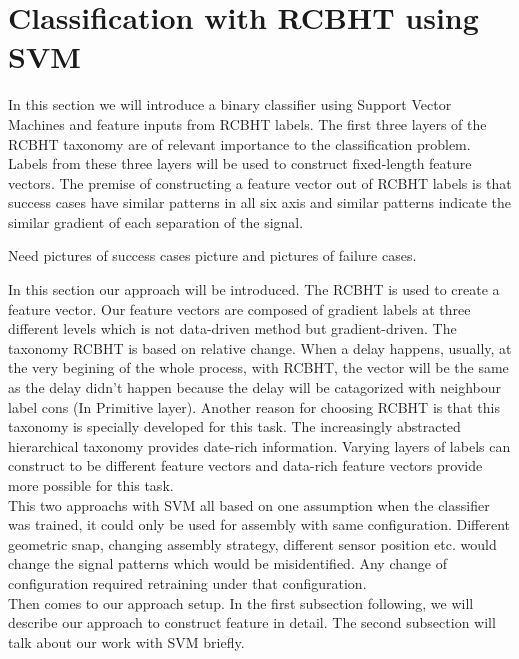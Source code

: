 %

\chapter{Classification with RCBHT using SVM}
In this section we will introduce a binary classifier using Support Vector Machines and feature inputs from RCBHT labels. The first three layers of the RCBHT taxonomy are of relevant importance to the classification problem. Labels from these three layers will be used to construct fixed-length feature vectors. The premise of constructing a feature vector out of RCBHT labels is that success cases have similar patterns in all six axis and similar patterns indicate the similar gradient of each separation of the signal.


\indent Need pictures of success cases picture and pictures of failure cases.



\indent In this section our approach will be introduced. The RCBHT is used to create a feature vector. Our feature vectors are composed of gradient labels at three different levels  which is not data-driven method but gradient-driven. The taxonomy RCBHT is based on relative change. When a delay happens, usually, at the very begining of the whole process, with RCBHT, the vector will be the same as the delay didn't happen because the delay will be catagorized with neighbour label cons (In Primitive layer). Another reason for choosing RCBHT is that this taxonomy is specially developed for this task. The increasingly abstracted hierarchical taxonomy provides date-rich information. Varying layers of labels can construct to be different feature vectors and data-rich feature vectors provide more possible for this task.\\ 
\indent This two approachs with SVM all based on one assumption when the classifier was trained, it could only be used for assembly with same configuration. Different geometric snap, changing assembly strategy, different sensor position etc. would change the signal patterns which would be misidentified. Any change of configuration required retraining under that configuration. \\
\indent Then comes to our approach setup. In the first subsection following, we will describe our approach to construct feature in detail. The second subsection will talk about our work with SVM briefly. 
